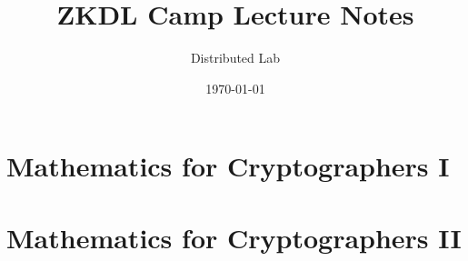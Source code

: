 \documentclass{zkdl-template}
\title{\huge\sffamily\bfseries ZKDL Camp Lecture Notes}
\author{\Large\sffamily Distributed Lab}
\date{\sffamily \today}
\begin{document}
\pagestyle{fancy}

\maketitle

\section{Mathematics for Cryptographers I}



\section{Mathematics for Cryptographers II}


\end{document}
